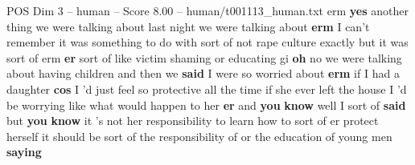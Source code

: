 \begin{textsample}{POS Dim 3 – human – Score 8.00 – human/t001113\_human.txt}  \label{ex:f3_pos_011}
erm \textbf{yes} another thing we were talking about last night we were talking about \textbf{erm} I can't remember it was something to do with sort of not rape culture exactly but it was sort of erm \textbf{er} sort of like victim shaming or educating gi \textbf{oh} no we were talking about having children and then we \textbf{said} I were so worried about \textbf{erm} if I had a daughter \textbf{cos} I 'd just feel so protective all the time if she ever left the house I 'd be worrying like what would happen to her \textbf{er} and \textbf{you} \textbf{know} well I sort of \textbf{said} but \textbf{you} \textbf{know} it 's not her responsibility to learn how to sort of er protect herself it should be sort of the responsibility of or the education of young men \textbf{saying}

\end{textsample}
